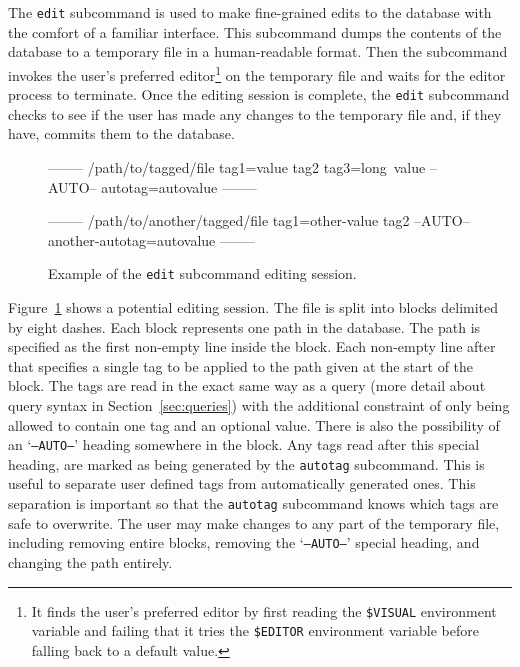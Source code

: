 The \texttt{edit} subcommand is used to make fine-grained edits to the database
with the comfort of a familiar interface. This subcommand dumps the contents of
the database to a temporary file in a human-readable format. Then the
subcommand invokes the user's preferred editor\footnote{It finds the user's
preferred editor by first reading the \texttt{\$VISUAL} environment variable and
failing that it tries the \texttt{\$EDITOR} environment variable before falling
back to a default value.} on the temporary file and waits for the editor
process to terminate. Once the editing session is complete, the \texttt{edit}
subcommand checks to see if the user has made any changes to the temporary
file and, if they have, commits them to the database.

\begin{figure}[h]
    \centering
    \begin{boxedverbatim}


--------
/path/to/tagged/file
tag1=value
tag2
tag3=long\ value
--AUTO--
autotag=autovalue
--------

--------
/path/to/another/tagged/file
tag1=other-value
tag2
--AUTO--
another-autotag=autovalue
--------
    \end{boxedverbatim}
    \label{fig:edit-subcommand-format}
    \caption{Example of the \texttt{edit} subcommand editing session.}
\end{figure}

Figure~\ref{fig:edit-subcommand-format} shows a potential editing session. The
file is split into blocks delimited by eight dashes. Each block represents one
path in the database. The path is specified as the first non-empty line inside
the block. Each non-empty line after that specifies a single tag to be applied
to the path given at the start of the block. The tags are read in the exact
same way as a query (more detail about query syntax in
Section~\ref{sec:queries}) with the additional constraint of only being
allowed to contain one tag and an optional value. There is also the possibility
of an `\texttt{--AUTO--}' heading somewhere in the block. Any tags read after
this special heading, are marked as being generated by the \texttt{autotag}
subcommand. This is useful to separate user defined tags from automatically
generated ones. This separation is important so that the \texttt{autotag}
subcommand knows which tags are safe to overwrite. The user may make changes to
any part of the temporary file, including removing entire blocks, removing the
`\texttt{--AUTO--}' special heading, and changing the path entirely.

